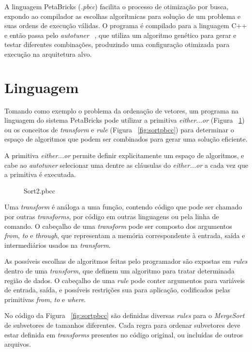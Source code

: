 \documentclass[a4paper, 11pt, twoside]{article}
\begin{document}
A linguagem PetaBricks (\emph{.pbcc}) facilita o processo de 
otimização por busca, expondo ao compilador as escolhas algorítmicas para 
solução de um problema e suas ordens de execução válidas. O programa é 
compilado para a linguagem C++ e então passa pelo \emph{autotuner} 
~\cite{ansel2011efficient}, que utiliza um algoritmo genético para gerar e 
testar diferentes combinações, produzindo uma configuração otimizada para 
execução na arquitetura alvo.

\section{Linguagem}

Tomando como exemplo o problema da ordenação de vetores, um programa na
linguagem do sistema PetaBricks pode utilizar a primitiva \emph{either...or} 
(Figura ~\ref{fig:sort2pbcc}) ou os conceitos de \emph{transform} e \emph{rule}
(Figura ~\ref{fig:sortpbcc}) para determinar o espaço de algoritmos que podem 
ser combinados para gerar uma solução eficiente.

A primitiva \emph{either...or} permite definir explicitamente um espaço
de algoritmos, e cabe ao \emph{autotuner} selecionar uma dentre as cláusulas
do \emph{either...or} a cada vez que a primitiva é executada.

\begin{figure}[H]
    \centering
    
    \caption{Sort2.pbcc}
    \label{fig:sort2pbcc}
\end{figure}

Uma \emph{transform} é análoga a uma função, contendo código que pode
ser chamado por outras \emph{transforms}, por código em outras linguagens
ou pela linha de comando. O cabeçalho de uma \emph{transform} pode ser composto
dos argumentos \emph{from}, \emph{to} e \emph{through}, que representam a
memória correspondente à entrada, saída e intermediários usados na 
\emph{transform}.

As possíveis escolhas de algoritmos feitas pelo programador são expostas 
em \emph{rules} dentro de uma \emph{transform}, que definem um algoritmo
para tratar determinada região de dados. O cabeçalho de uma \emph{rule} pode
conter argumentos para variáveis de entrada, saída, e possíveis restrições sua 
para aplicação, codificados pelas primitivas \emph{from}, \emph{to} e 
\emph{where}.

No código da Figura ~\ref{fig:sortpbcc} são definidas diversas \emph{rules}
para o \emph{MergeSort} de subvetores de tamanhos diferentes. Cada regra
para ordenar subvetores deve estar definida em \emph{transforms} presentes
no código original, ou incluídas de outros arquivos.
\end{document}
